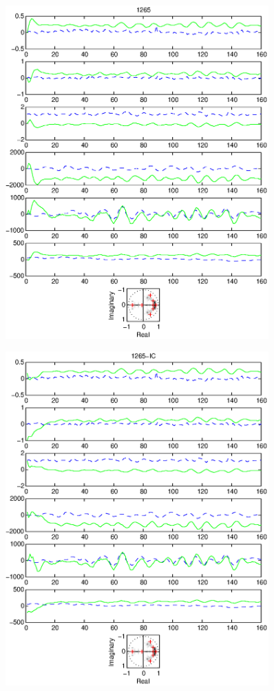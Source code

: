 \documentclass{article}
\begin{document}
\begin{figure}[htb!]
\centering
\includegraphics[width=0.9\textwidth]{1265.eps}
\end{figure}\clearpage
\begin{figure}[htb!]
\centering
\includegraphics[width=0.9\textwidth]{1265_ic.eps}
\end{figure}\clearpage
\end{document}
